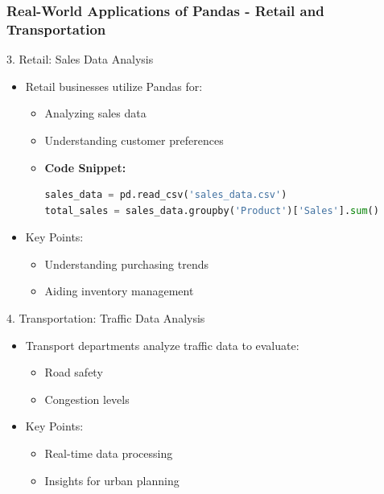 \documentclass{beamer}
\begin{document}
\begin{frame}[fragile]
    \frametitle{Real-World Applications of Pandas - Retail and Transportation}
    \begin{block}{3. Retail: Sales Data Analysis}
        \begin{itemize}
            \item Retail businesses utilize Pandas for:
            \begin{itemize}
                \item Analyzing sales data
                \item Understanding customer preferences
                \item \textbf{Code Snippet:}
                \begin{lstlisting}[language=Python]
sales_data = pd.read_csv('sales_data.csv')
total_sales = sales_data.groupby('Product')['Sales'].sum()
                \end{lstlisting}
            \end{itemize}
            \item Key Points:
            \begin{itemize}
                \item Understanding purchasing trends
                \item Aiding inventory management
            \end{itemize}
        \end{itemize}
    \end{block}
    
    \begin{block}{4. Transportation: Traffic Data Analysis}
        \begin{itemize}
            \item Transport departments analyze traffic data to evaluate:
            \begin{itemize}
                \item Road safety
                \item Congestion levels
            \end{itemize}
            \item Key Points:
            \begin{itemize}
                \item Real-time data processing
                \item Insights for urban planning
            \end{itemize}
        \end{itemize}
    \end{block}
\end{frame}
\end{document}
